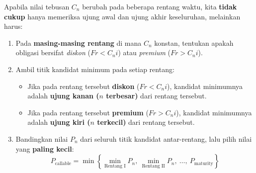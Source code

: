 \documentclass[11pt,a4paper]{article}
\begin{document}
\begin{notebox}
Apabila nilai tebusan $C_n$ berubah pada beberapa rentang waktu, kita \textbf{tidak cukup} hanya memeriksa ujung awal dan ujung akhir keseluruhan, melainkan harus:
\begin{enumerate}[label=\textbf{Langkah \arabic*:}, leftmargin=5.5em]
    \item Pada \textbf{masing-masing rentang} di mana $C_n$ konstan, tentukan apakah obligasi bersifat \textit{diskon} ($Fr < C_n i$) atau \textit{premium} ($Fr > C_n i$).
    \item Ambil titik kandidat minimum pada setiap rentang:
    \begin{itemize}
        \item Jika pada rentang tersebut \textbf{diskon} ($Fr < C_n i$), kandidat minimumnya adalah \textbf{ujung kanan ($n$ terbesar)} dari rentang tersebut.
        \item Jika pada rentang tersebut \textbf{premium} ($Fr > C_n i$), kandidat minimumnya adalah \textbf{ujung kiri ($n$ terkecil)} dari rentang tersebut.
    \end{itemize}
    \item Bandingkan nilai $P_n$ dari seluruh titik kandidat antar-rentang, lalu pilih nilai yang \textbf{paling kecil}:
    \[
        P_{\text{callable}} = \min\left\{\min_{\text{Rentang I}} P_n,\ \min_{\text{Rentang II}} P_n,\ \dots,\ P_{\text{maturity}}\right\}
    \]
\end{enumerate}
\end{notebox}
\end{document}
